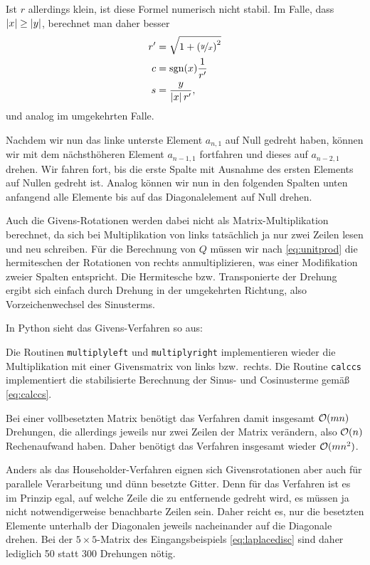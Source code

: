 Ist $r$ allerdings klein, ist diese Formel numerisch nicht stabil. Im
Falle, dass $\left\lvert{x}\right\rvert\ge\left\lvert{y}\right\rvert$, berechnet man daher besser
\begin{align}
  \label{eq:calccs}
  r'&=\sqrt{1 + \left(\nicefrac{y}{x}\right)^2}\nonumber\\
  c &=\text{sgn}(x)\frac{1}{r'}\\
  s &= \frac{y}{\left\lvert{x}\right\rvert r'}\nonumber,
\end{align}
und analog im
umgekehrten Falle.

Nachdem wir nun das linke unterste Element $a_{n,1}$ auf Null gedreht
haben, können wir mit dem nächsthöheren Element $a_{n-1,1}$ fortfahren
und dieses auf $a_{n-2,1}$ drehen. Wir fahren fort, bis die erste
Spalte mit Ausnahme des ersten Elements auf Nullen gedreht ist. Analog
können wir nun in den folgenden Spalten unten anfangend alle Elemente
bis auf das Diagonalelement auf Null drehen.

Auch die Givens-Rotationen werden dabei nicht als
Matrix-Multiplikation berechnet, da sich bei Multiplikation von links
tatsächlich ja nur zwei Zeilen lesen und neu schreiben. Für die
Berechnung von $Q$ müssen wir nach \eqref{eq:unitprod} die hermiteschen der
Rotationen von rechts anmultiplizieren, was einer Modifikation zweier
Spalten entspricht. Die Hermitesche bzw. Transponierte der Drehung
ergibt sich einfach durch Drehung in der umgekehrten Richtung, also
Vorzeichenwechsel des Sinusterms.

\clearpage

In Python sieht das Givens-Verfahren so aus:

Die Routinen \lstinline!multiplyleft! und \lstinline!multiplyright!
implementieren wieder die Multiplikation mit einer Givensmatrix von
links bzw.\ rechts. Die Routine \lstinline!calccs! implementiert die
stabilisierte Berechnung der Sinus- und Cosinusterme gemäß \eqref{eq:calccs}.

Bei einer vollbesetzten Matrix benötigt das Verfahren damit insgesamt
$\mathcal O(mn)$ Drehungen, die allerdings jeweils nur zwei Zeilen der Matrix
verändern, also $\mathcal O(n)$ Rechenaufwand haben. Daher benötigt das
Verfahren insgesamt wieder $\mathcal O(mn^2)$.

Anders als das Householder-Verfahren eignen sich Givensrotationen aber
auch für parallele Verarbeitung und dünn besetzte Gitter. Denn für das
Verfahren ist es im Prinzip egal, auf welche Zeile die zu entfernende
gedreht wird, es müssen ja nicht notwendigerweise benachbarte Zeilen
sein. Daher reicht es, nur die besetzten Elemente unterhalb der
Diagonalen jeweils nacheinander auf die Diagonale drehen. Bei der
$5\times 5$-Matrix des Eingangsbeispiels \eqref{eq:laplacedisc} sind
daher lediglich 50 statt 300 Drehungen nötig.

